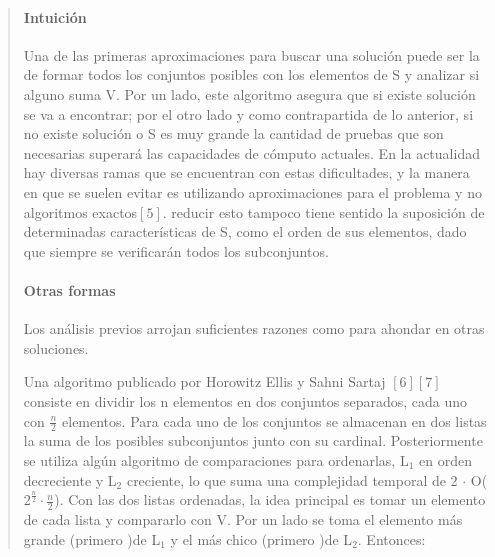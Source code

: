 \documentclass[8pt,a4paper]{article}
\begin{document}
\begin{verse}
	\paragraph{Intuición} 	Una de las primeras aproximaciones para buscar una solución puede ser la de formar todos los conjuntos posibles con los elementos de S y analizar si alguno suma V. Por un lado, este algoritmo asegura que si existe solución se va a encontrar; por el otro lado y como contrapartida de lo anterior, si no existe solución o S es muy grande la cantidad de pruebas que son necesarias superará las capacidades de cómputo actuales. En la actualidad hay diversas ramas que se encuentran con estas dificultades, y la manera en que se suelen evitar es utilizando aproximaciones para el problema y no algoritmos exactos$[5]$. reducir esto tampoco tiene sentido la suposición de determinadas características de S, como el orden de sus elementos, dado que siempre se verificarán todos los subconjuntos.
	
	\paragraph{Otras formas} Los análisis previos arrojan suficientes razones como para ahondar en otras soluciones.
	\bigskip
	
		Una algoritmo publicado por Horowitz Ellis y Sahni Sartaj $[6][7]$ consiste en dividir los n elementos en dos conjuntos separados, cada uno con $\frac{n}{2}$ elementos. Para cada uno de los conjuntos se almacenan en dos listas la suma de los posibles subconjuntos junto con su cardinal. Posteriormente se utiliza algún algoritmo de comparaciones para ordenarlas, L$_{1}$ en orden decreciente y L$_{2}$ creciente, lo que suma una complejidad temporal de 2 $\cdot$ O($2^{\frac{n}{2}} \cdot \frac{n}{2}$). Con las dos listas ordenadas, la idea principal es tomar un elemento de cada lista y compararlo con V. Por un lado se toma el elemento más grande (primero )de L$_{1}$ y el más chico (primero )de L$_{2}$. Entonces: 


\end{verse}
\end{document}
